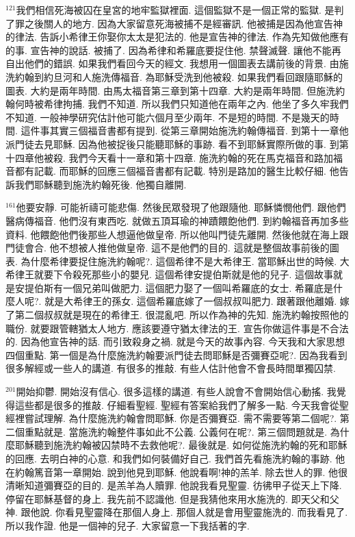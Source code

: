 \documentclass{book}
\begin{document}
$^{121}$我們相信死海被囚在皇宮的地牢監獄裡面.
這個監獄不是一個正常的監獄.
是判了罪之後關人的地方.
因為大家留意死海被捕不是經審訊.
他被捕是因為他宣告神的律法.
告訴小希律王你娶你太太是犯法的.
他是宣告神的律法.
作為先知做他應有的事.
宣告神的說話.
被捕了.
因為希律和希羅底要捉住他.
禁聲滅聲.
讓他不能再自出他們的錯誤.
如果我們看回今天的經文.
我想用一個圖表去講前後的背景.
由施洗約翰到約旦河和人施洗傳福音.
為耶穌受洗到他被殺.
如果我們看回跟隨耶穌的圖表.
大約是兩年時間.
由馬太福音第三章到第十四章.
大約是兩年時間.
但施洗約翰何時被希律拘捕.
我們不知道.
所以我們只知道他在兩年之內.
他坐了多久牢我們不知道.
一般神學研究估計他可能六個月至少兩年.
不是短的時間.
不是幾天的時間.
這件事其實三個福音書都有提到.
從第三章開始施洗約翰傳福音.
到第十一章他派門徒去見耶穌.
因為他被捉後只能聽耶穌的事跡.
看不到耶穌實際所做的事.
到第十四章他被殺.
我們今天看十一章和第十四章.
施洗約翰的死在馬克福音和路加福音都有記載.
而耶穌的回應三個福音書都有記載.
特別是路加的醫生比較仔細.
他告訴我們耶穌聽到施洗約翰死後.
他獨自離開.

$^{161}$他要安靜.
可能祈禱可能悲傷.
然後民眾發現了他跟隨他.
耶穌憐憫他們.
跟他們醫病傳福音.
他們沒有東西吃.
就做五頂耳瑜的神蹟餵飽他們.
到約翰福音再加多些資料.
他餵飽他們後那些人想逼他做皇帝.
所以他叫門徒先離開.
然後他就在海上跟門徒會合.
他不想被人推他做皇帝.
這不是他們的目的.
這就是整個故事前後的圖表.
為什麼希律要捉住施洗約翰呢?.
這個希律不是大希律王.
當耶穌出世的時候.
大希律王就要下令殺死那些小的嬰兒.
這個希律安提伯斯就是他的兒子.
這個故事就是安提伯斯有一個兄弟叫做肥力.
這個肥力娶了一個叫希羅底的女士.
希羅底是什麼人呢?.
就是大希律王的孫女.
這個希羅底嫁了一個叔叔叫肥力.
跟著跟他離婚.
嫁了第二個叔叔就是現在的希律王.
很混亂吧.
所以作為神的先知.
施洗約翰按照他的職份.
就要跟管轄猶太人地方.
應該要遵守猶太律法的王.
宣告你做這件事是不合法的.
因為他宣告神的話.
而引致殺身之禍.
就是今天的故事內容.
今天我和大家思想四個重點.
第一個是為什麼施洗約翰要派門徒去問耶穌是否彌賽亞呢?.
因為我看到很多解經或一些人的講道.
有很多的推敲.
有些人估計他會不會長時間單獨囚禁.

$^{201}$開始抑鬱.
開始沒有信心.
很多這樣的講道.
有些人說會不會開始信心動搖.
我覺得這些都是很多的推敲.
仔細看聖經.
聖經有答案給我們了解多一點.
今天我會從聖經裡嘗試理解.
為什麼施洗約翰會問耶穌.
你是否彌賽亞.
需不需要等第二個呢?.
第二個重點就是.
當施洗約翰整件事如此不公義.
公義何在呢?.
第三個問題就是.
為什麼耶穌聽到施洗約翰被囚禁時不去救他呢?.
最後就是.
如何從施洗約翰的死和耶穌的回應.
去明白神的心意.
和我們如何裝備好自己.
我們首先看施洗約翰的事跡.
他在約翰篤音第一章開始.
說到他見到耶穌.
他說看啊!神的羔羊.
除去世人的罪.
他很清晰知道彌賽亞的目的.
是羔羊為人贖罪.
他說我看見聖靈.
彷彿甲子從天上下降.
停留在耶穌基督的身上.
我先前不認識他.
但是我猜他來用水施洗的.
即天父和父神.
跟他說.
你看見聖靈降在那個人身上.
那個人就是會用聖靈施洗的.
而我看見了.
所以我作證.
他是一個神的兒子.
大家留意一下我括著的字.
\end{document}
